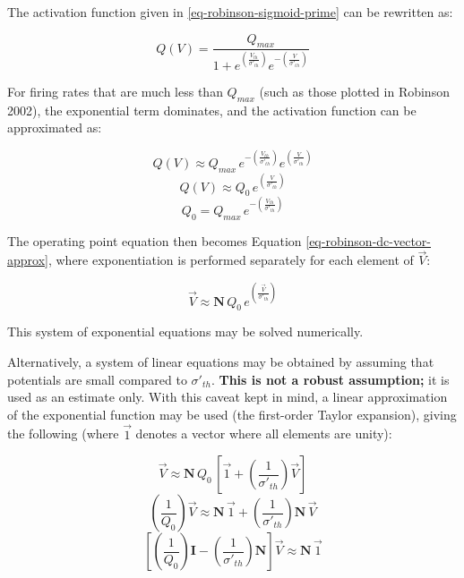 The activation function given in \ref{eq-robinson-sigmoid-prime} can be
rewritten as:

\begin{equation}
Q(V) = \frac{Q_{max}}{1 +
e^{\left ( \frac{V_{th}}{\sigma'_{th}} \right )}
e^{- \left ( \frac{V}{\sigma'_{th}} \right )}
}
\label{eq-robinson-sigmoid-shuffle-1}
\end{equation}

For firing rates that are much less than $Q_{max}$ (such as those plotted
in Robinson 2002), the exponential term dominates, and the activation
function can be approximated as:

\begin{equation}
Q(V) \approx Q_{max} \, e^{- \left ( \frac{V_{th}}{\sigma'_{th}} \right )}
e^{\left ( \frac{V}{\sigma'_{th}} \right )}
\label{eq-robinson-sigmoid-approx-full}
\end{equation}
%
\begin{equation}
Q(V) \approx Q_0 \, e^{\left ( \frac{V}{\sigma'_{th}} \right )}
\label{eq-robinson-sigmoid-approx}
\end{equation}
%
\begin{equation}
Q_0 = Q_{max} \, e^{- \left ( \frac{V_{th}}{\sigma'_{th}} \right )}
\label{eq-robinson-sigmoid-q0}
\end{equation}

The operating point equation then becomes Equation
\ref{eq-robinson-dc-vector-approx}, where exponentiation is performed
separately for each element of $\vec{V}$:

\begin{equation}
\vec{V} \approx
\mathbf{N} \, Q_0 \, e^{\left ( \frac{\vec{V}}{\sigma'_{th}} \right )}
\label{eq-robinson-dc-vector-approx}
\end{equation}

This system of exponential equations may be solved numerically.

Alternatively, a system of linear equations may be obtained by assuming
that potentials are small compared to $\sigma'_{th}$.
\textbf{This is not a robust assumption;} it is used as an estimate only.
With this caveat kept in mind, a linear approximation of the exponential
function may be used (the first-order Taylor expansion), giving the following
(where $\vec{1}$ denotes a vector where all elements are unity):

\begin{equation}
\vec{V} \approx \mathbf{N} \, Q_0 \,
\left [ \vec{1} + \left ( \frac{1}{\sigma'_{th}} \right ) \vec{V} \right ]
\end{equation}
%
\begin{equation}
\left ( \frac{1}{Q_0} \right ) \vec{V} \approx \mathbf{N} \, \vec{1}
+ \left ( \frac{1}{\sigma'_{th}} \right ) \mathbf{N} \, \vec{V}
\end{equation}
%
\begin{equation}
\left [ \left ( \frac{1}{Q_0} \right ) \mathbf{I}
- \left ( \frac{1}{\sigma'_{th}} \right ) \mathbf{N}
\right ] \vec{V} \approx \mathbf{N} \, \vec{1}
\label{eq-robinson-dc-vector-linear}
\end{equation}

